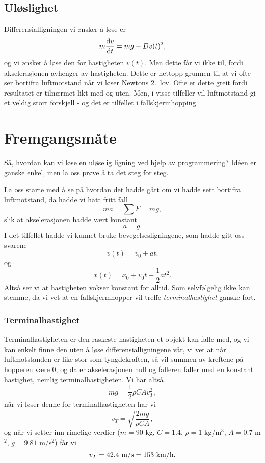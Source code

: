 \documentclass[a4paper, 11pt, notitlepage]{article}
\renewcommand{\d}{{\rm d}}
\begin{document}
\subsection*{Uløslighet}
Differensialligningen vi ønsker å løse er
$$m\frac{\d v}{\d t} = mg - D v(t)^2,$$
og vi ønsker å løse den for hastigheten $v(t)$. Men dette får vi ikke til, fordi akselerasjonen avhenger av hastigheten. Dette er nettopp grunnen til at vi ofte ser bortifra luftmotstand når vi løser Newtons 2.\ lov. Ofte er dette greit fordi resultatet er tilnærmet likt med og uten. Men, i visse tilfeller vil luftmotstand gi et veldig stort forskjell - og det er tilfellet i fallskjermhopping.

\section{Fremgangsmåte}
Så, hvordan kan vi løse en uløselig ligning ved hjelp av programmering? Idéen er ganske enkel, men la oss prøve å ta det steg for steg.

La oss starte med å se på hvordan det hadde gått om vi hadde sett bortifra luftmotstand, da hadde vi hatt fritt fall
$$ma = \sum F = mg,$$
slik at akselerasjonen hadde vært konstant
$$a = g.$$
I det tilfellet hadde vi kunnet bruke bevegelsesligningene, som hadde gitt oss svarene
$$v(t) = v_0 + at.$$
og 
$$x(t) = x_0 + v_0 t + \frac{1}{2}at^2.$$
Altså ser vi at hastigheten vokser konstant for alltid. Som selvfølgelig ikke kan stemme, da vi vet at en fallskjermhopper vil treffe \emph{terminalhastighet} ganske fort.

\subsubsection*{Terminalhastighet}
Terminalhastigheten er den raskeste hastigheten et objekt kan falle med, og vi kan enkelt finne den uten å løse differensialligningene vår, vi vet at når luftmotstanden er like stor som tyngdekraften, så vil summen av kreftene på hopperen være 0, og da er akselerasjonen null og falleren faller med en konstant hastighet, nemlig terminalhastigheten. Vi har altså
$$mg = \frac{1}{2}\rho C A v_T^2,$$
når vi løser denne for terminalhastigheten har vi
$$v_T = \sqrt{\frac{2mg}{\rho C A}},$$
og når vi setter inn rimelige verdier ($m=90$ kg, $C=1.4$, $\rho=1$ kg/m$^3$, $A=0.7$ m$^2$, $g=9.81$ m/s$^2$) får vi
$$v_T = 42.4 {\rm\ m/s} = 153 {\rm\ km/h}.$$
\end{document}
